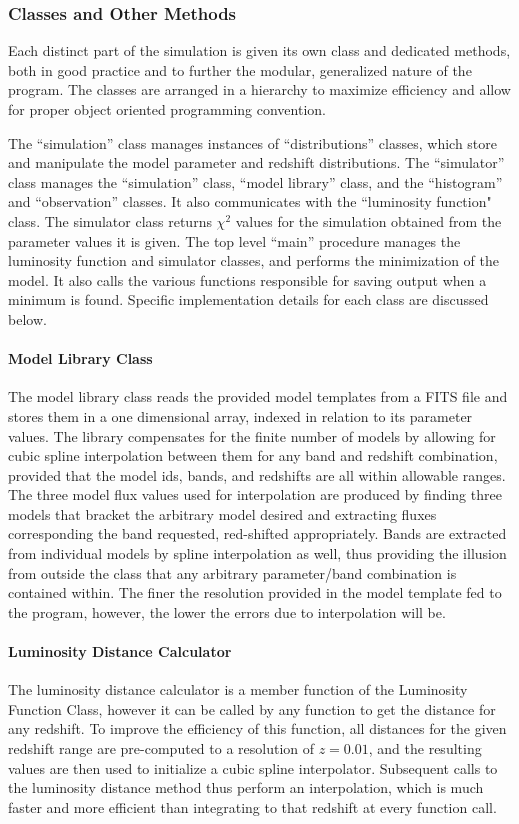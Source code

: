 \documentclass[twocolumn,letterpaper,10pt]{article}
\begin{document}
\subsubsection{Classes and Other Methods}
Each distinct part of the simulation is given its own class and dedicated methods, both in good practice and to further the modular, generalized nature of the program. The classes are arranged in a hierarchy to maximize efficiency and allow for proper object oriented programming convention. 

The ``simulation'' class manages instances of ``distributions'' classes, which store and manipulate the model parameter and redshift distributions. The ``simulator'' class manages the ``simulation'' class, ``model library'' class, and the ``histogram'' and ``observation'' classes. It also communicates with the ``luminosity function" class. The simulator class returns $\chi^2$ values for the simulation obtained from the parameter values it is given. The top level ``main'' procedure manages the luminosity function and simulator classes, and performs the minimization of the model. It also calls the various functions responsible for saving output when a minimum is found. Specific implementation details for each class are discussed below.

\paragraph{Model Library Class}\label{class:models}
The model library class reads the provided model templates from a FITS file and stores them in a one dimensional array, indexed in relation to its parameter values. The library compensates for the finite number of models by allowing for cubic spline interpolation between them for any band and redshift combination, provided that the model ids, bands, and redshifts are all within allowable ranges. The three model flux values used for interpolation are produced by finding three models that bracket the arbitrary model desired and extracting fluxes corresponding the band requested, red-shifted appropriately. Bands are extracted from individual models by spline interpolation as well, thus providing the illusion from outside the class that any arbitrary parameter/band combination is contained within. The finer the resolution provided in the model template fed to the program, however, the lower the errors due to interpolation will be. 

\paragraph{Luminosity Distance Calculator}
The luminosity distance calculator is a member function of the Luminosity Function Class, however it can be called by any function to get the distance for any redshift. To improve the efficiency of this function, all distances for the given redshift range are pre-computed to a resolution of $z=0.01$, and the resulting values are then used to initialize a cubic spline interpolator. Subsequent calls to the luminosity distance method thus perform an interpolation, which is much faster and more efficient than integrating to that redshift at every function call.
\end{document}
